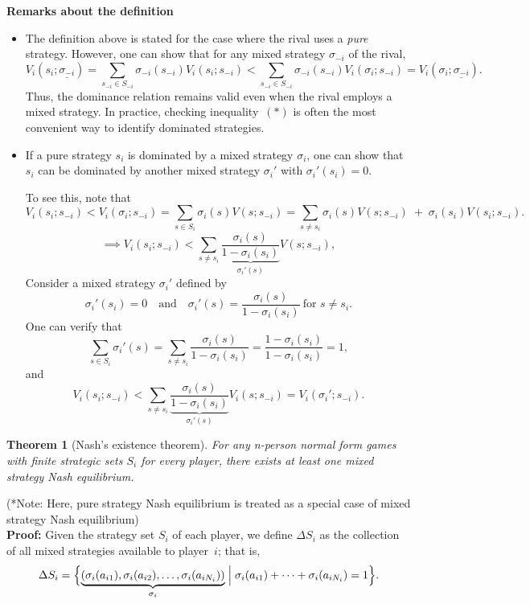 \documentclass[twoside]{article}
\theoremstyle{definitionstyle}
\newtheorem*{theorem}{Theorem}
\begin{document}
\textbf{Remarks about the definition}

\begin{itemize}
\item The definition above is stated for the case where the rival uses a \emph{pure} strategy. However, one can show that for any mixed strategy \(\sigma_{-i}\) of the rival,
\[
V_i(s_i; \underline{\sigma_{-i}}) = \sum_{s_{-i} \in S_{-i}} \sigma_{-i}(s_{-i}) V_i(s_i; s_{-i})
< \sum_{s_{-i} \in S_{-i}} \sigma_{-i}(s_{-i}) V_i(\sigma_i; s_{-i})
= V_i(\sigma_i; \underline{\sigma_{-i}}).
\]
Thus, the dominance relation remains valid even when the rival employs a mixed strategy. In practice, checking inequality~\((*)\) is often the most convenient way to identify dominated strategies.

\item If a pure strategy \(s_i\) is dominated by a mixed strategy \(\sigma_i\), one can show that $s_i$ can be dominated by another mixed strategy \(\sigma_i'\) with \(\sigma_i'(s_i)=0\).

To see this, note that
\[
V_i(s_i; s_{-i}) < V_i(\sigma_i; s_{-i})
= \sum_{s \in S_i} \sigma_i(s) V(s; s_{-i})
= \sum_{s \neq s_i} \sigma_i(s) V(s; s_{-i}) \;+\; \sigma_i(s_i) V(s_i; s_{-i}).
\]
\[
\implies V_i(s_i; s_{-i}) < \sum_{s \neq s_i} \underbrace{\frac{\sigma_i(s)}{1 - \sigma_i(s_i)}}_{\displaystyle\sigma_i'(s)} V(s; s_{-i}),
\]
Consider a mixed strategy \(\sigma_i'\) defined by
\[
\sigma_i'(s_i)=0 \quad\text{and}\quad
\sigma_i'(s)=\frac{\sigma_i(s)}{1-\sigma_i(s_i)}\ \text{for } s\neq s_i.
\]
One can verify that
\[
\sum_{s\in S_i} \sigma_i'(s)
= \sum_{s\neq s_i} \frac{\sigma_i(s)}{1-\sigma_i(s_i)}
= \frac{1-\sigma_i(s_i)}{1-\sigma_i(s_i)} = 1,
\]
and
\[
V_i(s_i; s_{-i}) 
< \sum_{s\neq s_i} \underbrace{\frac{\sigma_i(s)}{1-\sigma_i(s_i)}}_{\displaystyle\sigma_i'(s)} V_i(s; s_{-i})
= V_i(\sigma_i'; s_{-i}).
\]
\end{itemize}
\begin{theorem}[Nash’s existence theorem]
   For any n-person normal form games with finite strategic sets $S_i$ for every player, there exists at least one mixed strategy Nash equilibrium. 
\end{theorem}
(*Note: Here, pure strategy Nash equilibrium is treated as a special case of mixed strategy Nash equilibrium) \\
\textbf{Proof: }Given the strategy set $S_i$ of each player, we define $\Delta S_i$ as the collection of all mixed strategies available to player~$i$; that is,
\[
\Delta S_i = \Bigl\{ 
\underbrace{(\sigma_i(a_{i1}), \sigma_i(a_{i2}), \dots, \sigma_i(a_{iN_i}))}_{\sigma_i}
\Bigm|
\sigma_i(a_{i1}) + \dots + \sigma_i(a_{iN_i}) = 1
\Bigr\}.
\]
\end{document}
